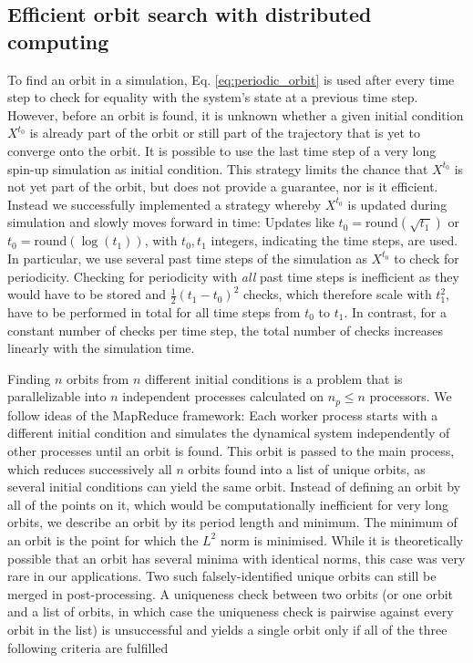 \subsection{Efficient orbit search with distributed computing}
\label{sec:distributed_orbit_search}

To find an orbit in a simulation, Eq. \ref{eq:periodic_orbit} is used after every time step to check for equality with the
system's state at a previous time step. However, before an orbit is found, it is unknown whether a given initial condition $X^{t_0}$
is already part of the orbit or still part of the trajectory that is yet to converge onto the orbit. It is possible to use the last time step
of a very long spin-up simulation as initial condition. This strategy limits the chance that $X^{t_0}$ is not yet part of the orbit,
but does not provide a guarantee, nor is it efficient. Instead we successfully implemented a strategy whereby $X^{t_0}$ is updated
during simulation and slowly moves forward in time: Updates like $t_0 = \mathrm{round}(\sqrt{t_1})$ or $t_0 = \mathrm{round}(\log(t_1))$,
with $t_0,t_1$  integers, indicating the time steps, are used. In particular, we use several past time steps of the simulation as $X^{t_0}$
to check for periodicity. Checking for periodicity with \emph{all} past time steps is inefficient as they would have to be stored and
$\tfrac{1}{2}(t_1-t_0)^2$ checks, which therefore scale with $t_1^2$, have to be performed in total for all time steps from $t_0$ to $t_1$.
In contrast, for a constant number of checks per time step, the total number of checks increases linearly with the simulation time.

Finding $n$ orbits from $n$ different initial conditions is a problem that is parallelizable into $n$  independent processes calculated
on $n_p \leq n$  processors. We follow ideas of the MapReduce framework: Each worker process starts with a different initial condition
and simulates the dynamical system independently of other processes until an orbit is found. This orbit is passed to the main process,
which reduces successively all $n$ orbits found into a list of unique orbits, as several initial conditions can yield the same orbit.
Instead of defining an orbit by all of the points on it, which would be computationally inefficient for very long orbits, we describe
an orbit by its period length and minimum. The minimum of an orbit is the point for which the $L^2$ norm is minimised.  While it is
theoretically possible that an orbit has several minima with identical norms, this case was very rare in our applications.
Two such falsely-identified unique orbits can still be merged in post-processing.
A uniqueness check between two orbits (or one orbit and a list of orbits, in which case the uniqueness check is pairwise against every
orbit in the list) is unsuccessful and yields a single orbit only if all of the three following criteria are fulfilled

